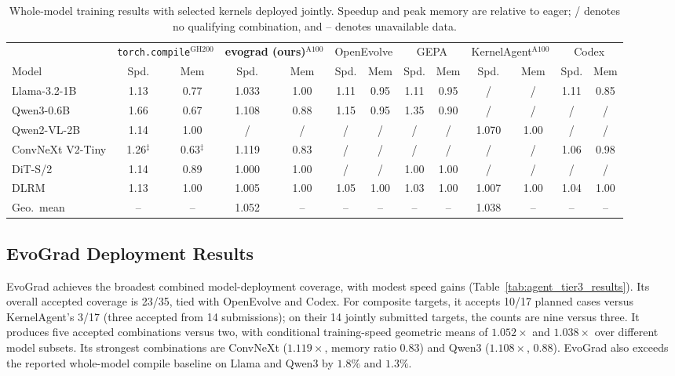 \begin{table}[t]
\centering
\caption{Whole-model training results with selected kernels deployed jointly. Speedup and peak memory are relative to eager; / denotes no qualifying combination, and -- denotes unavailable data.}
\label{tab:agent_tier3_by_model}
\footnotesize
\setlength{\tabcolsep}{2pt}
\begin{tabular}{@{}l cc cc cc cc cc cc@{}}
\toprule
 & \multicolumn{2}{c}{\texttt{torch.compile}$^{\mathrm{GH200}}$}
 & \multicolumn{2}{c}{\textbf{evograd (ours)}$^{\mathrm{A100}}$}
 & \multicolumn{2}{c}{OpenEvolve}
 & \multicolumn{2}{c}{GEPA}
 & \multicolumn{2}{c}{KernelAgent$^{\mathrm{A100}}$}
 & \multicolumn{2}{c}{Codex} \\
\cmidrule(lr){2-3} \cmidrule(lr){4-5} \cmidrule(lr){6-7}
\cmidrule(lr){8-9} \cmidrule(lr){10-11} \cmidrule(lr){12-13}
Model & Spd. & Mem & Spd. & Mem & Spd. & Mem
 & Spd. & Mem & Spd. & Mem & Spd. & Mem \\
\midrule
Llama-3.2-1B & 1.13 & 0.77 & 1.033 & 1.00 & 1.11 & 0.95 & 1.11 & 0.95 & / & / & 1.11 & 0.85 \\
Qwen3-0.6B & 1.66 & 0.67 & 1.108 & 0.88 & 1.15 & 0.95 & 1.35 & 0.90 & / & / & / & / \\
Qwen2-VL-2B & 1.14 & 1.00 & / & / & / & / & / & / & 1.070 & 1.00 & / & / \\
ConvNeXt V2-Tiny & 1.26$^{\ddagger}$ & 0.63$^{\ddagger}$ & 1.119 & 0.83 & / & / & / & / & / & / & 1.06 & 0.98 \\
DiT-S/2 & 1.14 & 0.89 & 1.000 & 1.00 & / & / & 1.00 & 1.00 & / & / & / & / \\
DLRM & 1.13 & 1.00 & 1.005 & 1.00 & 1.05 & 1.00 & 1.03 & 1.00 & 1.007 & 1.00 & 1.04 & 1.00 \\
\midrule
Geo.\ mean & -- & -- & 1.052 & -- & -- & -- & -- & -- & 1.038 & -- & -- & -- \\
\bottomrule
\end{tabular}
\end{table}


\subsection{EvoGrad Deployment Results}
\label{sec:evograd_results}

EvoGrad achieves the broadest combined model-deployment coverage, with modest speed gains (Table~\ref{tab:agent_tier3_results}). Its overall accepted coverage is 23/35, tied with OpenEvolve and Codex. For composite targets, it accepts 10/17 planned cases versus KernelAgent's 3/17 (three accepted from 14 submissions); on their 14 jointly submitted targets, the counts are nine versus three. It produces five accepted combinations versus two, with conditional training-speed geometric means of $1.052\times$ and $1.038\times$ over different model subsets. Its strongest combinations are ConvNeXt ($1.119\times$, memory ratio $0.83$) and Qwen3 ($1.108\times$, $0.88$). EvoGrad also exceeds the reported whole-model compile baseline on Llama and Qwen3 by $1.8\%$ and $1.3\%$.

